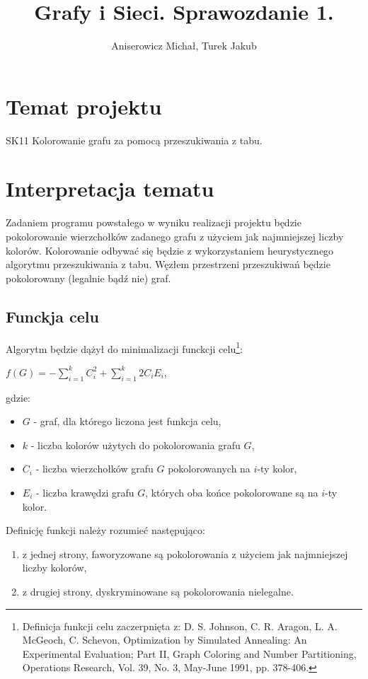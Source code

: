 \documentclass[a4paper,10pt]{article}
\title{Grafy i Sieci. Sprawozdanie 1.}
\author{Aniserowicz Michał, Turek Jakub}
\begin{document}
\maketitle

\section{Temat projektu}

SK11 Kolorowanie grafu za pomocą przeszukiwania z tabu.



\section{Interpretacja tematu}
Zadaniem programu powstałego w wyniku realizacji projektu będzie pokolorowanie wierzchołków zadanego grafu z użyciem jak najmniejszej liczby kolorów.
Kolorowanie odbywać się będzie z wykorzystaniem heurystycznego algorytmu przeszukiwania z tabu.
Węzłem przestrzeni przeszukiwań będzie pokolorowany (legalnie bądź nie) graf.

\subsection{Funckja celu}
Algorytm będzie dążył do minimalizacji funckcji celu\footnote{Definicja funkcji celu zaczerpnięta z: D. S. Johnson, C. R. Aragon, L. A. McGeoch, C. Schevon, Optimization by Simulated Annealing: An Experimental Evaluation; Part II, Graph Coloring and Number Partitioning, Operations Research, Vol. 39, No. 3, May-June 1991, pp. 378-406.}:

$f(G) = -\sum_{i=1}^{k} C_i^2 + \sum_{i=1}^{k} 2 C_i E_i$,

gdzie:
\begin{itemize}
 \item $G$ - graf, dla którego liczona jest funkcja celu,
 \item $k$ - liczba kolorów użytych do pokolorowania grafu $G$,
 \item $C_i$ - liczba wierzchołków grafu $G$ pokolorowanych na $i$-ty kolor,
 \item $E_i$ - liczba krawędzi grafu $G$, których oba końce pokolorowane są na $i$-ty kolor.
\end{itemize}

Definicję funkcji należy rozumieć następująco:

\begin{enumerate}
 \item z jednej strony, faworyzowane są pokolorowania z użyciem jak najmniejszej liczby kolorów,
 \item z drugiej strony, dyskryminowane są pokolorowania nielegalne.
\end{enumerate}
\end{document}
